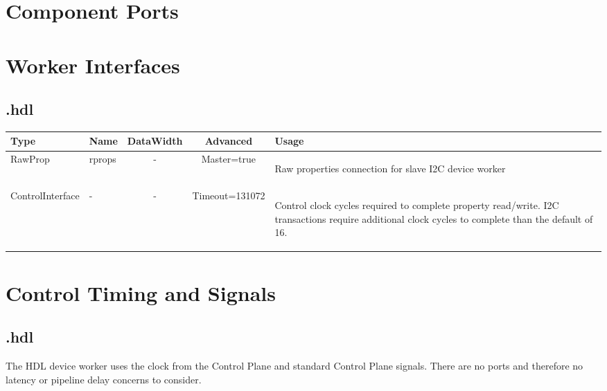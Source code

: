 \begin{landscape}
\begin{scriptsize}
	\end{scriptsize}

	\section*{Component Ports}
	\begin{scriptsize}
	\end{scriptsize}

	\section*{Worker Interfaces}
	\subsection*{\comp.hdl}
	\begin{scriptsize}
		\begin{tabular}{|M{2cm}|M{1.5cm}|c|c|M{13.85cm}|}
			\hline
			Type & Name & DataWidth & Advanced & Usage \\
			\hline
			RawProp
			& rprops
			& -
			& Master=true
			& \begin{flushleft}Raw properties connection for slave I2C device worker\end{flushleft}\\
			\hline
			ControlInterface
			& -
			& -
			& Timeout=131072
			& \begin{flushleft}Control clock cycles required to complete property  read/write. I2C transactions require additional clock cycles to complete than the default of 16. \end{flushleft}\\
			\hline
		\end{tabular}
	\end{scriptsize}
\end{landscape}

\section*{Control Timing and Signals}
\subsection*{\comp.hdl}
\begin{flushleft}
The \Comp{} HDL device worker uses the clock from the Control Plane and standard Control Plane signals. There are no ports and therefore no latency or pipeline delay concerns to consider.
\end{flushleft}

